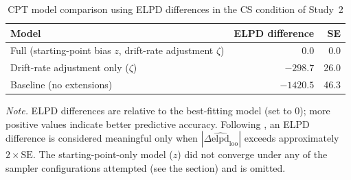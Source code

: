 \documentclass[man,floatsintext]{apa7}
\begin{document}
\begin{table}[!htbp]
\centering
\begin{threeparttable}\small
\caption{CPT model comparison using ELPD differences in the CS condition of Study~2}
\label{tab:cpt_mc_cs_study2}
\begin{tabularx}{\linewidth}{@{} >{\raggedright\arraybackslash}X rr @{}}
\toprule
\textbf{Model} & \textbf{ELPD difference} & \textbf{SE} \\
\midrule
Full (starting-point bias $z$, drift-rate adjustment $\zeta$) & 0.0 & 0.0 \\
Drift-rate adjustment only ($\zeta$) & $-298.7$ & 26.0 \\
Baseline (no extensions) & $-1420.5$ & 46.3 \\
\bottomrule
\end{tabularx}
\begin{tablenotes}
\item \textit{Note.} ELPD differences are relative to the best-fitting model (set to 0); more positive values indicate better predictive accuracy. Following \textcite{vehtari_practical_2017}, an ELPD difference is considered meaningful only when $|\Delta\widehat{\mathrm{elpd}}_{\mathrm{loo}}|$ exceeds approximately $2 \times \mathrm{SE}$. The starting-point-only model ($z$) did not converge under any of the sampler configurations attempted (see the  section) and is omitted. 
\end{tablenotes}
\end{threeparttable}
\end{table}
\end{document}
